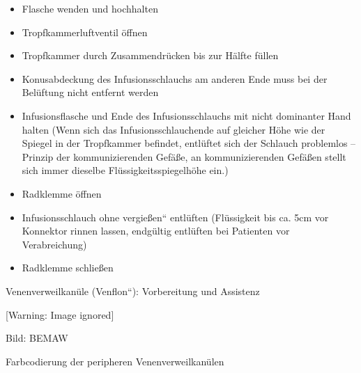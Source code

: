 \documentclass{article}
\newcommand\gZ[1]{\textcolor[rgb]{0.5019608,0.5019608,0.5019608}{#1}}
\begin{document}
\begin{itemize}
\item {\mdseries
Flasche wenden und hochhalten}

\item {\mdseries
Tropfkammerluftventil \"offnen}

\item {\mdseries
Tropfkammer durch Zusammendr\"ucken bis zur H\"alfte f\"ullen}

\item {\mdseries
Konusabdeckung des Infusionsschlauchs am anderen Ende muss bei der
Bel\"uftung nicht entfernt werden}

\item {\mdseries
Infusionsflasche und Ende des Infusionsschlauchs mit nicht dominanter
Hand halten \newline
\gZ{(Wenn sich das Infusionsschlauchende auf gleicher
H\"ohe wie der Spiegel in der Tropfkammer befindet, entl\"uftet sich
der Schlauch problemlos -- \newline
Prinzip der kommunizierenden Gef\"a{\ss}e, an kommunizierenden
Gef\"a{\ss}en stellt sich immer dieselbe Fl\"ussigkeitsspiegelh\"ohe
ein.)}}

\item {\mdseries
Radklemme \"offnen}

\item {\mdseries
Infusionsschlauch {\quotedblbase}ohne vergie{\ss}en{\textquotedblleft}
entl\"uften %
%
\gZ{(Fl\"ussigkeit bis ca. 5cm vor Konnektor rinnen
lassen, endg\"ultig entl\"uften bei Patienten vor Verabreichung)}}

\item {\mdseries
Radklemme schlie{\ss}en}

\end{itemize}
{\mdseries\color[rgb]{0.0,0.0,0.5019608}
Venenverweilkan\"ule ({\quotedblbase}Venflon{\textquotedblleft}):
Vorbereitung und Assistenz }

  [Warning: Image ignored] %
 

{\mdseries\upshape
Bild: BEMAW}

{\color{black}
Farbcodierung der peripheren Venenverweilkan\"ulen}
\end{document}
